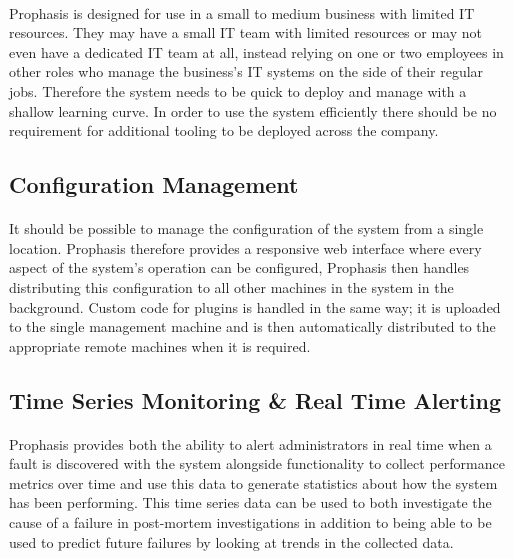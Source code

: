 \documentclass[bsc,logo,twoside]{infthesis}
\begin{document}
\paragraph*{}
	Prophasis is designed for use in a small to medium business with limited IT
	resources.  They may have a small IT team with limited resources or may not
	even have a dedicated IT team at all, instead relying on one or two employees
	in other roles who manage the business's IT systems on the side of their
	regular jobs. Therefore the system needs to be quick to deploy and manage with
	a shallow learning curve. In order to use the system efficiently there should
	be no requirement for additional tooling to be deployed across the company.
	
\subsection{Configuration Management}
\paragraph*{}
	It should be possible to manage the configuration of the system from a single
	location.  Prophasis therefore provides a responsive web interface where every
	aspect of the system's operation can be configured, Prophasis then handles
	distributing this configuration to all other machines in the system in the
	background. Custom code for plugins is handled in the same way; it is uploaded
	to the single management machine and is then automatically distributed to the
	appropriate remote machines when it is required.
	
\subsection{Time Series Monitoring \& Real Time Alerting}
\paragraph*{}
	Prophasis provides both the ability to alert administrators in real time when
	a fault is discovered with the system alongside functionality to collect
	performance metrics over time and use this data to generate statistics about
	how the system has been performing.  This time series data can be used to both
	investigate the cause of a failure in post-mortem investigations in addition
	to being able to be used to predict future failures by looking at trends in
	the collected data.
	
\end{document}
